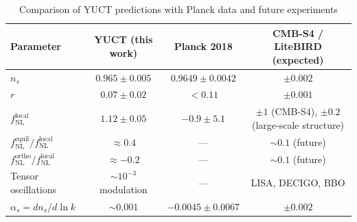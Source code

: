 \documentclass[12pt,a4paper]{article}
\newcommand{\rs}{r}
\begin{document}
	\begin{table}[htbp]
		\centering
		\caption{Comparison of YUCT predictions with Planck data and future experiments}
		\label{tab:comparison}
		\begin{tabular}{lccc}
			\toprule
			\textbf{Parameter} & \textbf{YUCT (this work)} & \textbf{Planck 2018} & \textbf{CMB‑S4 / LiteBIRD (expected)} \\
			\midrule
			\(n_s\) & \(0.965 \pm 0.005\) & \(0.9649 \pm 0.0042\) & \(\pm 0.002\) \\
			\(\rs\) & \(0.07 \pm 0.02\) & \(<0.11\) & \(\pm 0.001\) \\
			\(f_{\mathrm{NL}}^{\mathrm{local}}\) & \(1.12 \pm 0.05\) & \(-0.9 \pm 5.1\) & \(\pm 1\) (CMB‑S4), \(\pm 0.2\) (large‑scale structure) \\
			\(f_{\mathrm{NL}}^{\mathrm{equil}} / f_{\mathrm{NL}}^{\mathrm{local}}\) & \(\approx 0.4\) & — & \(\sim 0.1\) (future) \\
			\(f_{\mathrm{NL}}^{\mathrm{ortho}} / f_{\mathrm{NL}}^{\mathrm{local}}\) & \(\approx -0.2\) & — & \(\sim 0.1\) (future) \\
			Tensor oscillations & \( \sim 10^{-3}\) modulation & — & LISA, DECIGO, BBO \\
			\(\alpha_s = dn_s/d\ln k\) & \(\sim 0.001\) & \(-0.0045 \pm 0.0067\) & \(\pm 0.002\) \\
			\bottomrule
		\end{tabular}
	\end{table}
	
\end{document}
